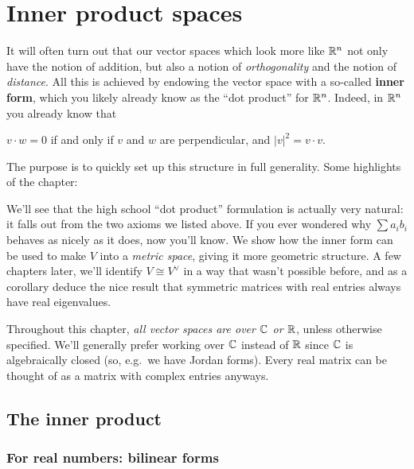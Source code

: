 \chapter{Inner product spaces}
It will often turn out that our vector spaces which look more like $\mathbb R^n$
not only have the notion of addition, but also a notion of \emph{orthogonality}
and the notion of \emph{distance}.
All this is achieved by endowing the vector space with a so-called \textbf{inner form},
which you likely already know as the ``dot product'' for $\mathbb R^n$.
Indeed, in $\mathbb R^n$ you already know that
\begin{itemize}
	\ii $v \cdot w = 0$ if and only if $v$ and $w$ are perpendicular, and
	\ii $|v|^2 = v \cdot v$.
\end{itemize}
The purpose is to quickly set up this structure in full generality.
Some highlights of the chapter:
\begin{itemize}
	\ii We'll see that the high school ``dot product''
	formulation is actually very natural:
	it falls out from the two axioms we listed above.
	If you ever wondered why $\sum a_i b_i$ behaves as nicely as it does,
	now you'll know.
	\ii We show how the inner form can be used to make $V$ into a \emph{metric space},
	giving it more geometric structure.
	\ii A few chapters later,
	we'll identify $V \cong V^\vee$ in a way that wasn't possible before,
	and as a corollary deduce the nice result that
	symmetric matrices with real entries
	always have real eigenvalues.
\end{itemize}

Throughout this chapter, \emph{all vector spaces are over $\mathbb C$ or $\mathbb R$},
unless otherwise specified.
We'll generally prefer working over $\mathbb C$ instead of $\mathbb R$ since
$\mathbb C$ is algebraically closed
(so, e.g.\ we have Jordan forms).
Every real matrix can be thought of as a matrix
with complex entries anyways.

\section{The inner product}
\subsection{For real numbers: bilinear forms}

